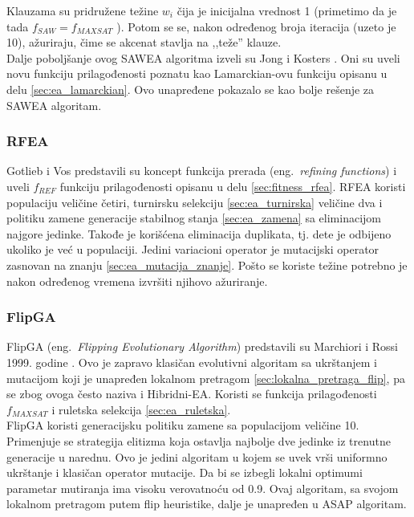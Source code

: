 \documentclass[a4paper]{article}
\begin{document}
Klauzama su pridružene težine $w_i$ čija je inicijalna vrednost 1 
(primetimo da je tada $f_{SAW} = f_{MAXSAT}$ ). 
Potom se se, nakon određenog broja iteracija (uzeto je 10),
ažuriraju, čime se akcenat stavlja na ,,teže'' klauze.\\

Dalje poboljšanje ovog SAWEA algoritma izveli su Jong i Kosters \cite{Jong&Kosters}.
Oni su uveli novu funkciju prilagođenosti poznatu kao Lamarckian-ovu funkciju 
opisanu u delu \ref{sec:ea_lamarckian}. Ovo unapređene pokazalo se kao bolje rešenje za
SAWEA algoritam.


\subsubsection{RFEA}
\label{sec:ea_rfea}
Gotlieb i Vos \cite{GotVos98_f_ref, ea_with_table, ea_without_table} predstavili su koncept
funkcija prerada (eng.~{\em refining functions}) i uveli $f_{REF}$ funkciju prilagođenosti
opisanu u delu \ref{sec:fitness_rfea}. 
RFEA koristi populaciju veličine četiri, turnirsku selekciju \ref{sec:ea_turnirska}
veličine dva i politiku zamene generacije stabilnog stanja \ref{sec:ea_zamena} 
sa eliminacijom najgore jedinke. 
Takođe je korišćena eliminacija duplikata, tj. dete je odbijeno ukoliko je već u populaciji.
Jedini variacioni operator je mutacijski operator zasnovan na znanju \ref{sec:ea_mutacija_znanje}.
Pošto se koriste težine potrebno je nakon određenog vremena izvršiti njihovo ažuriranje.


\subsubsection{FlipGA}
\label{sec:ea_flipga}
FlipGA (eng.~{\em Flipping Evolutionary Algorithm}) predstavili su Marchiori i Rossi 1999.
godine \cite{MaRos99_flipGA, ea_with_table}. Ovo je zapravo klasičan evolutivni algoritam
sa ukrštanjem i mutacijom koji je unapređen lokalnom pretragom 
\ref{sec:lokalna_pretraga_flip}, pa se zbog ovoga često naziva i Hibridni-EA. 
Koristi se funkcija prilagođenosti $f_{MAXSAT}$ i ruletska selekcija \ref{sec:ea_ruletska}.\\

FlipGA koristi generacijsku politiku zamene sa populacijom veličine 10.
Primenjuje se strategija elitizma koja ostavlja najbolje dve jedinke iz trenutne generacije 
u narednu. Ovo je jedini algoritam u kojem se uvek vrši uniformno ukrštanje i klasičan operator mutacije. Da bi se izbegli lokalni optimumi parametar mutiranja 
ima visoku verovatnoću od 0.9. 
Ovaj algoritam, sa svojom lokalnom pretragom putem flip heuristike,
dalje je unapređen u ASAP algoritam.
\end{document}
